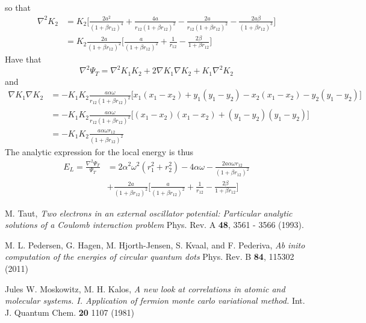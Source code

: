 \documentclass[english, a4paper]{article}
\begin{document}
so that
\begin{align}
 \nabla^2 K_2 &= K_2\Biggr[\frac{2a^2}{(1 + \beta r_{12})^4} + \frac{4a}{r_{12}(1 + \beta r_{12})^2}
              - \frac{2a}{r_{12}(1 + \beta r_{12})^2} - \frac{2a\beta}{(1 + \beta r_{12})^3} \Biggr] \\
              &= K_2\frac{2a}{(1+\beta r_{12})^2}\Biggr[ \frac{a}{(1+\beta r_{12})^2} + 
              \frac{1}{r_{12}} - \frac{2\beta}{1 + \beta r_{12}} \Biggr]
\end{align}
Have that
\begin{equation}
 \nabla^2 \Psi_T = \nabla^2K_1K_2 + 2\nabla K_1\nabla K_2 + K_1\nabla^2K_2
\end{equation}
and
\begin{align}
 \nabla K_1 \nabla K_2 &= -K_1K_2 \frac{a\alpha \omega}{r_{12}(1+\beta r_{12})^2}
 \Bigr[x_1(x_1 - x_2) + y_1(y_1 - y_2) - x_2(x_1 - x_2) - y_2(y_1 - y_2)\Bigr] \\
 &= -K_1K_2 \frac{a\alpha \omega}{r_{12}(1+\beta r_{12})^2}
 \Bigr[(x_1 - x_2)(x_1 - x_2) + (y_1 - y_2)(y_1 - y_2)\Bigr] \\
 &= -K_1K_2 \frac{a\alpha \omega r_{12}}{(1+\beta r_{12})^2}
\end{align}
The analytic expression for the local energy is thus
\begin{align}
 E_L = \frac{\nabla^2\Psi_T}{\Psi_T} &= 2\alpha^2 \omega^2(r_1^2 + r_2^2) - 4\alpha \omega
 - \frac{2a\alpha \omega r_{12}}{(1+\beta r_{12})^2} \\
 &+ \frac{2a}{(1+\beta r_{12})^2}\Biggr[ \frac{a}{(1+\beta r_{12})^2} + 
              \frac{1}{r_{12}} - \frac{2\beta}{1 + \beta r_{12}} \Biggr]
              \label{analyticLocalEnergy}
\end{align}



















\begin{thebibliography}{9}


 M. Taut, 
 \textit{Two electrons in an external oscillator potential: Particular analytic solutions
 of a Coulomb interaction problem}
 Phys. Rev. A {\bf 48}, 3561 - 3566 (1993).
 
 M. L. Pedersen, G. Hagen, M. Hjorth-Jensen, S. Kvaal, and F. Pederiva, 
 \textit{Ab inito computation of the energies of circular quantum dots}
 Phys. Rev. B {\bf 84}, 115302 (2011)
 
 Jules W. Moskowitz, M. H. Kalos,
 \textit{A new look at correlations in atomic and molecular systems. 
         I. Application of fermion monte carlo variational method.}
 Int. J. Quantum Chem. {\bf 20} 1107 (1981)

\end{thebibliography}
\end{document}
